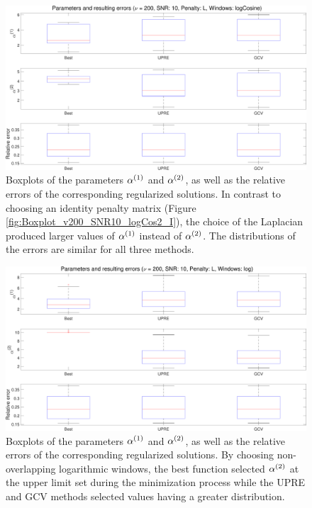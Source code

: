 \documentclass[12pt]{article}
\begin{document}
\begin{figure}[ht]
\centering
\includegraphics[width=1.0\textwidth]{Figures/Boxplot_v200_SNR10_logCos2_L.pdf}
\caption{Boxplots of the parameters $\alpha^{(1)}$ and $\alpha^{(2)}$, as well as the relative errors of the corresponding regularized solutions. In contrast to choosing an identity penalty matrix (Figure \ref{fig:Boxplot_v200_SNR10_logCos2_I}), the choice of the Laplacian produced larger values of $\alpha^{(1)}$ instead of $\alpha^{(2)}$. The distributions of the errors are similar for all three methods.}
\label{fig:Boxplot_v200_SNR10_logCos2_L}
\end{figure}

\begin{figure}[ht]
\centering
\includegraphics[width=1.0\textwidth]{Figures/Boxplot_v200_SNR10_log2_L.pdf}
\caption{Boxplots of the parameters $\alpha^{(1)}$ and $\alpha^{(2)}$, as well as the relative errors of the corresponding regularized solutions. By choosing non-overlapping logarithmic windows, the best function selected $\alpha^{(2)}$ at the upper limit set during the minimization process while the UPRE and GCV methods selected values having a greater distribution.}
\label{fig:Boxplot_v200_SNR10_log2_L}
\end{figure}
\end{document}
